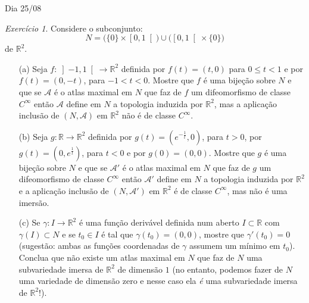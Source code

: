 \documentclass[oneside,11pt]{amsart}
\newcommand{\R}{\mathds R}
\theoremstyle{remark}\newtheorem{exercise}{Exercício}[section]
\theoremstyle{plain}\newtheorem{teo}{Teorema}[section]
\theoremstyle{plain}\newtheorem{lem}[teo]{Lema}
\theoremstyle{plain}\newtheorem{prop}[teo]{Proposição}
\theoremstyle{definition}\newtheorem{defin}[teo]{Definição}
\theoremstyle{remark}\newtheorem{rem}[teo]{Observação}
\theoremstyle{definition}\newtheorem{example}[teo]{Exemplo}
\numberwithin{equation}{section}
\begin{document}
\begin{section}{Dia 25/08}
\begin{exercise}
Considere o subconjunto:
\[N=\big(\{0\}\times\left[0,1\right[\big)\cup\big(\left[0,1\right[\times\{0\}\!\big)\]
de $\R^2$.
\begin{itemize}
\item[(a)] Seja $f:\left]-1,1\right[\to\R^2$ definida por $f(t)=(t,0)$ para $0\le t<1$ e por $f(t)=(0,-t)$, para $-1<t<0$. Mostre que $f$
é uma bijeção sobre $N$ e que se $\mathcal A$ é o atlas maximal em $N$ que faz de $f$ um difeomorfismo de classe $C^\infty$ então $\mathcal A$ define em $N$
a topologia induzida por $\R^2$, mas a aplicação inclusão de $(N,\mathcal A)$ em $\R^2$ não é de classe $C^\infty$.
\item[(b)] Seja $g:\R\to\R^2$ definida por $g(t)=(e^{-\frac1t},0)$, para $t>0$, por $g(t)=(0,e^{\frac1t})$, para $t<0$ e por $g(0)=(0,0)$.
Mostre que $g$ é uma bijeção sobre $N$ e que se $\mathcal A'$ é o atlas maximal em $N$ que faz de $g$ um difeomorfismo de classe $C^\infty$ então
$\mathcal A'$ define em $N$ a topologia induzida por $\R^2$ e a aplicação inclusão de $(N,\mathcal A')$ em $\R^2$ é de classe $C^\infty$, mas não é uma imersão.
\item[(c)] Se $\gamma:I\to\R^2$ é uma função derivável definida num aberto $I\subset\R$ com $\gamma(I)\subset N$ e se $t_0\in I$ é tal que
$\gamma(t_0)=(0,0)$, mostre que $\gamma'(t_0)=0$ (sugestão: ambas as funções coordenadas de $\gamma$ assumem um mínimo em $t_0$). Conclua que não existe
um atlas maximal em $N$ que faz de $N$ uma subvariedade imersa de $\R^2$ de dimensão $1$ (no entanto, podemos fazer de $N$ uma variedade de dimensão zero
e nesse caso ela {\em é\/} uma subvariedade imersa de $\R^2$!).
\end{itemize}
\end{exercise}


\end{section}
\end{document}
